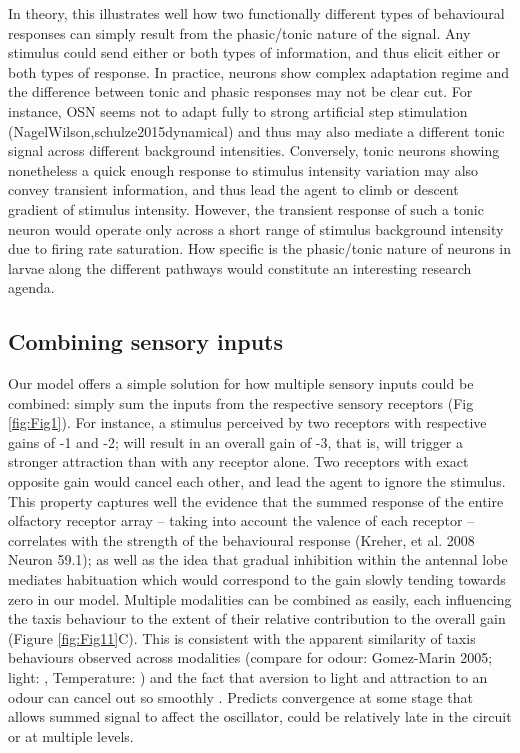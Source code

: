 \documentclass[10pt,a4paper]{article}
\begin{document}
In theory, this illustrates well how two functionally different types of behavioural responses can simply result from the phasic/tonic nature of the signal. Any stimulus could send either or both types of information, and thus elicit either or both types of response. In practice, neurons show complex adaptation regime and the difference between tonic and phasic responses may not be clear cut. For instance, OSN seems not to adapt fully to strong artificial step stimulation (NagelWilson,schulze2015dynamical) and thus may also mediate a different tonic signal across different background intensities. Conversely, tonic neurons showing nonetheless a quick enough response to stimulus intensity variation may also convey transient information, and thus lead the agent to climb or descent gradient of stimulus intensity. However, the transient response of such a tonic neuron would operate only across a short range of stimulus background intensity due to firing rate saturation. How specific is the phasic/tonic nature of neurons in larvae along the different pathways would constitute an interesting research agenda.

\subsection{Combining sensory inputs}
Our model offers a simple solution for how multiple sensory inputs could be combined: simply sum the inputs from the respective sensory receptors (Fig \ref{fig:Fig1}). For instance, a stimulus perceived by two receptors with respective gains of -1 and -2; will result in an overall gain of -3, that is, will trigger a stronger attraction than with any receptor alone. Two receptors with exact opposite gain would cancel each other, and lead the agent to ignore the stimulus. This property captures well the evidence that the summed response of the entire olfactory receptor array – taking into account the valence of each receptor – correlates with the strength of the behavioural response (Kreher, et al. 2008 Neuron 59.1); as well as the idea that gradual inhibition within the antennal lobe mediates habituation \citep{das2011plasticity} which would correspond to the gain slowly tending towards zero in our model. 
Multiple modalities can be combined as easily, each influencing the taxis behaviour to the extent of their relative contribution to the overall gain (Figure \ref{fig:Fig11}C). This is consistent with the apparent similarity of taxis behaviours observed across modalities (compare for odour: Gomez-Marin 2005; light: \cite{kane2013sensorimotor},   Temperature: \cite{lahiri2011two}) and the fact that aversion to light and attraction to an odour can cancel out so smoothly \cite{bellmann2010optogenetically}. Predicts convergence at some stage that allows summed signal to affect the oscillator, could be relatively late in the circuit or at multiple levels.
\end{document}
